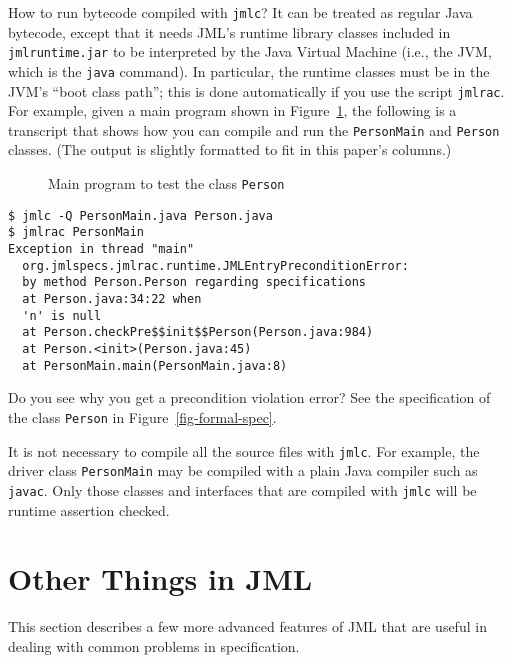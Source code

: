 \documentclass{jotarticle}
\begin{document}
How to run bytecode compiled with \texttt{jmlc}?  It can be treated as
regular Java bytecode, except that it needs JML's runtime library
classes included in \texttt{jmlruntime.jar} 
to be interpreted by the Java Virtual Machine (i.e., the JVM, which is
the \texttt{java} command). In
particular, the runtime classes must be in the JVM's
``boot class path'';
this is done automatically if you use the script \texttt{jmlrac}.  For
example, given a main program shown in
Figure~\ref{fig-class-personmain}, the following is a transcript that
shows how you can compile and run the \texttt{PersonMain} 
and \texttt{Person} classes.
(The output is slightly formatted to fit in this paper's columns.)

\begin{figure}

\caption{Main program to test the class \texttt{Person}}
\label{fig-class-personmain}
\end{figure}

\begin{verbatim}
$ jmlc -Q PersonMain.java Person.java
$ jmlrac PersonMain
Exception in thread "main"
  org.jmlspecs.jmlrac.runtime.JMLEntryPreconditionError: 
  by method Person.Person regarding specifications 
  at Person.java:34:22 when
  'n' is null
  at Person.checkPre$$init$$Person(Person.java:984)
  at Person.<init>(Person.java:45)
  at PersonMain.main(PersonMain.java:8)
\end{verbatim}

Do you see why you get a precondition violation error?  See the
specification of the class \texttt{Person} in
Figure~\ref{fig-formal-spec}.

It is not necessary to compile all the
source files with \texttt{jmlc}.  For example, the driver class
\texttt{PersonMain} may be compiled with a plain Java compiler such as
\texttt{javac}. Only those classes and interfaces that are compiled
with \texttt{jmlc} will be runtime assertion checked.


\section{Other Things in JML}

This section describes a few more advanced features of JML that are
useful in dealing with common problems in specification.
\end{document}
